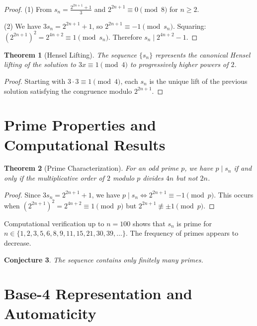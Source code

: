 \documentclass[11pt]{article}
\newtheorem{theorem}{Theorem}[section]
\newtheorem{conjecture}[theorem]{Conjecture}
\theoremstyle{definition}
\begin{document}
\begin{proof}
(1) From $s_n = \frac{2^{2n+1} + 1}{3}$ and $2^{2n+1} \equiv 0 \pmod{8}$ for $n \geq 2$.

(2) We have $3s_n = 2^{2n+1} + 1$, so $2^{2n+1} \equiv -1 \pmod{s_n}$.
Squaring: $(2^{2n+1})^2 = 2^{4n+2} \equiv 1 \pmod{s_n}$.
Therefore $s_n \mid 2^{4n+2} - 1$.
\end{proof}

\begin{theorem}[Hensel Lifting]\label{thm:hensel}
The sequence $\{s_n\}$ represents the canonical Hensel lifting of the solution to $3x \equiv 1 \pmod{4}$ to progressively higher powers of $2$.
\end{theorem}

\begin{proof}
Starting with $3 \cdot 3 \equiv 1 \pmod{4}$, each $s_n$ is the unique lift of the previous solution satisfying the congruence modulo $2^{2n+1}$.
\end{proof}

\section{Prime Properties and Computational Results}

\begin{theorem}[Prime Characterization]\label{thm:prime-char}
For an odd prime $p$, we have $p \mid s_n$ if and only if the multiplicative order of $2$ modulo $p$ divides $4n$ but not $2n$.
\end{theorem}

\begin{proof}
Since $3s_n = 2^{2n+1} + 1$, we have $p \mid s_n \Leftrightarrow 2^{2n+1} \equiv -1 \pmod{p}$. This occurs when $(2^{2n+1})^2 = 2^{4n+2} \equiv 1 \pmod{p}$ but $2^{2n+1} \not\equiv \pm 1 \pmod{p}$.
\end{proof}

Computational verification up to $n = 100$ shows that $s_n$ is prime for $n \in \{1, 2, 3, 5, 6, 8, 9, 11, 15, 21, 30, 39, \ldots\}$. The frequency of primes appears to decrease.

\begin{conjecture}\label{conj:finite-primes}
The sequence contains only finitely many primes.
\end{conjecture}

\section{Base-4 Representation and Automaticity}
\end{document}
